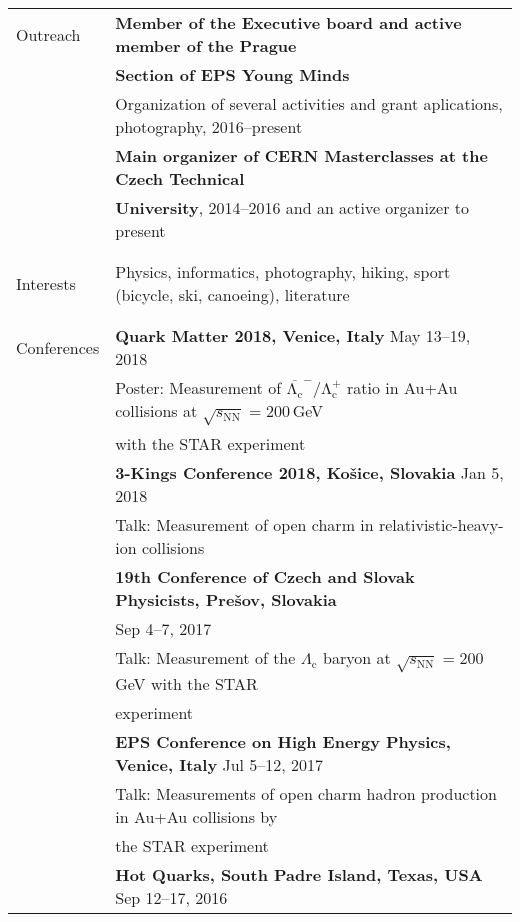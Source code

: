 \documentclass[a4paper,11pt,oneside]{article}
\begin{document}
\noindent  \begin{tabular}{@{} l l}
\Large{Outreach }    
     & \textbf{Member of the Executive board and active member of the Prague} \\
     & \textbf{Section of EPS Young Minds} \\
     & Organization of several activities and grant aplications, photography, 2016--present \\[.2cm]
     & \textbf{Main organizer of CERN Masterclasses at the Czech Technical} \\
     & \textbf{University}, 2014--2016 and an active organizer to present \\
     & \\
     \\
\Large{Interests}    
     & Physics, informatics, photography, hiking, sport (bicycle, ski, canoeing), literature \\
     & \\
     \\
\Large{Conferences}
     & \textbf{Quark Matter 2018, Venice, Italy} May 13--19, 2018 \\
     & Poster: Measurement of $\mathrm{\overline{\Lambda_c}^-/\Lambda_c^+}$ ratio in Au+Au collisions at $\sqrt{s_\mathrm{NN}} = 200\,$GeV\\
     &with the STAR experiment \\[.2cm]
     & \textbf{3-Kings Conference 2018, Košice, Slovakia} Jan 5, 2018 \\
     & Talk: Measurement of open charm in relativistic-heavy-ion collisions \\[.2cm]
     & \textbf{19th Conference of Czech and Slovak Physicists, Prešov, Slovakia}\\
     & Sep 4--7, 2017 \\
     & Talk: Measurement of the $\Lambda_\mathrm{c}$ baryon at $\sqrt{s_\mathrm{NN}} = 200\,$GeV with the STAR \\
     & experiment\\[.2cm]
     & \textbf{EPS Conference on High Energy Physics, Venice, Italy} Jul 5--12, 2017\\
     & Talk: Measurements of open charm hadron production in Au+Au collisions by  \\
     & the STAR experiment \\[.2cm]
     & \textbf{Hot Quarks, South Padre Island, Texas, USA} Sep 12--17, 2016\\

\end{tabular}
\end{document}
